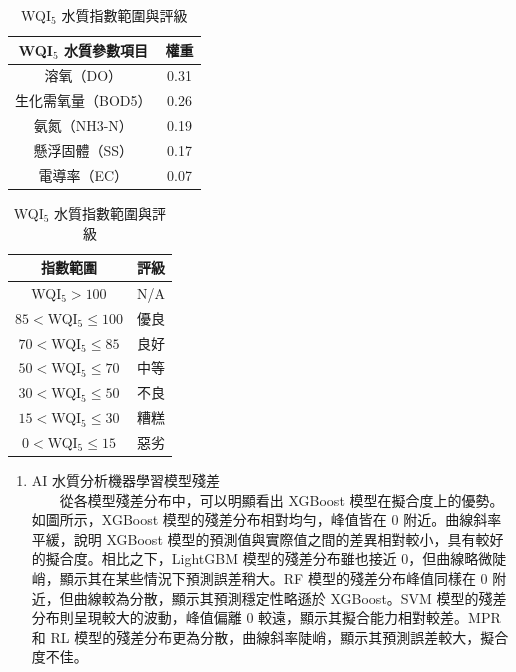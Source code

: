 \documentclass[12pt,a4paper]{article}
\begin{document}
\begin{enumerate}
\begin{enumerate}[label=\arabic*.]
\begin{enumerate}[label=3-2-\arabic*.]
\begin{table}[H]
\begin{minipage}{0.45\textwidth}
                    \begin{tabular}{cc}
                    \hline
                    WQI$_5$ 水質參數項目 & 權重 \\
                    \hline
                    溶氧（DO） & 0.31 \\
                    生化需氧量（BOD5） & 0.26 \\
                    氨氮（NH3-N） & 0.19 \\
                    懸浮固體（SS） & 0.17 \\
                    電導率（EC） & 0.07 \\
                    \hline
                    \end{tabular}
                    \label{table:wqi_weights}
                \end{minipage}
                \begin{minipage}{0.45\textwidth}
                    \centering
                    \caption{WQI$_5$ 水質指數範圍與評級}
                    \begin{tabular}{cc}
                    \hline
                    指數範圍 & 評級 \\
                    \hline
                    WQI$_5>100$ & N/A \\
                    $85<$WQI$_5\leq100$ & 優良 \\
                    $70<$WQI$_5\leq85$ & 良好 \\
                    $50<$WQI$_5\leq70$ & 中等 \\
                    $30<$WQI$_5\leq50$ & 不良 \\
                    $15<$WQI$_5\leq30$ & 糟糕 \\
                    $0<$WQI$_5\leq15$ & 惡劣 \\
                    \hline
                    \end{tabular}
                    \label{table:wqi_grades}
                \end{minipage}
            \end{table}
            \begin{enumerate}[label=\Alph*.]
                \item AI 水質分析機器學習模型殘差\\
                　　從各模型殘差分布中，可以明顯看出 XGBoost 模型在擬合度上的優勢。如圖所示，XGBoost 模型的殘差分布相對均勻，峰值皆在 0 附近。曲線斜率平緩，說明 XGBoost 模型的預測值與實際值之間的差異相對較小，具有較好的擬合度。相比之下，LightGBM 模型的殘差分布雖也接近 0，但曲線略微陡峭，顯示其在某些情況下預測誤差稍大。RF 模型的殘差分布峰值同樣在 0 附近，但曲線較為分散，顯示其預測穩定性略遜於 XGBoost。SVM 模型的殘差分布則呈現較大的波動，峰值偏離 0 較遠，顯示其擬合能力相對較差。MPR 和 RL 模型的殘差分布更為分散，曲線斜率陡峭，顯示其預測誤差較大，擬合度不佳。\\

\end{enumerate}
\end{enumerate}
\end{enumerate}
\end{enumerate}
\end{document}
